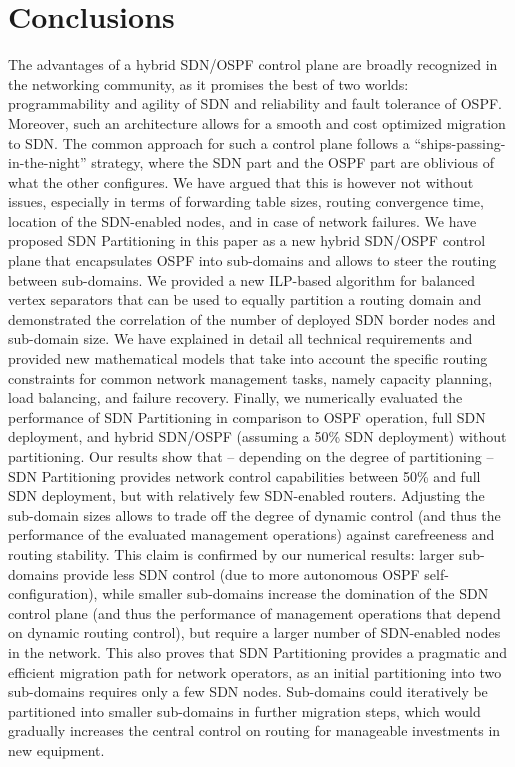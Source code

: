 \documentclass[journal]{IEEEtran}
\begin{document}
\section{Conclusions}\label{conclusions}
The advantages of a hybrid SDN/OSPF control plane are broadly recognized in the networking community, as it promises the best of two worlds: programmability and agility of SDN and reliability and fault tolerance of OSPF. Moreover, such an architecture allows for a smooth and cost optimized migration to SDN. The common approach for such a control plane follows a ``ships-passing-in-the-night'' strategy, where the SDN part and the OSPF part are oblivious of what the other configures. We have argued that this is however not without issues, especially in terms of forwarding table sizes, routing convergence time, location of the SDN-enabled nodes, and in case of network failures. We have proposed SDN Partitioning in this paper as a new hybrid SDN/OSPF control plane that encapsulates OSPF into sub-domains and allows to steer the routing between sub-domains. We provided a new ILP-based algorithm for balanced vertex separators that can be used to equally partition a routing domain and demonstrated the correlation of the number of deployed SDN border nodes and sub-domain size. We have explained in detail all technical requirements and provided new mathematical models that take into account the specific routing constraints for common network management tasks, namely capacity planning, load balancing, and failure recovery. Finally, we numerically evaluated the performance of SDN Partitioning in comparison to OSPF operation, full SDN deployment, and hybrid SDN/OSPF (assuming a 50\% SDN deployment) without partitioning. Our results show that -- depending on the degree of partitioning -- SDN Partitioning provides network control capabilities between 50\% and full SDN deployment, but with relatively few SDN-enabled routers. Adjusting the sub-domain sizes allows to trade off the degree of dynamic control (and thus the performance of the evaluated management operations) against carefreeness and routing stability. This claim is confirmed by our numerical results: larger sub-domains provide less SDN control (due to more autonomous OSPF self-configuration), while smaller sub-domains increase the domination of the SDN control plane (and thus the performance of management operations that depend on dynamic routing control), but require a larger number of SDN-enabled nodes in the network. This also proves that SDN Partitioning provides a pragmatic and efficient migration path for network operators, as an initial partitioning into two sub-domains requires only a few SDN nodes. Sub-domains could iteratively be partitioned into smaller sub-domains in further migration steps, which would gradually increases the central control on routing for manageable investments in new equipment.
\end{document}
